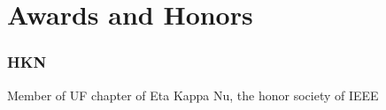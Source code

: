\documentclass{article}
\newcommand{\sectionspacing}{\vspace{-0em}} %
\newenvironment{CustomItemize}
{ \begin{itemize}[leftmargin=1em]
    \setlength{\itemsep}{0pt}
    \setlength{\parskip}{0pt}
    \setlength{\parindent}{0pt}
    \setlength{\parsep}{0pt}     }
{ \end{itemize}                  }
\begin{document}




\sectionspacing{}
\section{Awards and Honors}

\subsubsection{HKN}
Member of UF chapter of Eta Kappa Nu, the honor society of IEEE
\end{document}
